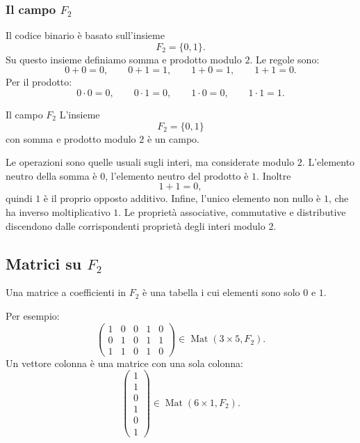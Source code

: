 \documentclass[a4paper]{article}
\begin{document}
\subsubsection{Il campo \(F_2\)}

Il codice binario è basato sull'insieme
\[
    F_2=\{0,1\}.
\]
Su questo insieme definiamo somma e prodotto modulo \(2\). Le regole sono:
\[
    0+0=0,
    \qquad
    0+1=1,
    \qquad
    1+0=1,
    \qquad
    1+1=0.
\]
Per il prodotto:
\[
    0\cdot 0=0,
    \qquad
    0\cdot 1=0,
    \qquad
    1\cdot 0=0,
    \qquad
    1\cdot 1=1.
\]

\begin{snippetproposition}{Il campo \(F_2\)}
    L'insieme
    \[
        F_2=\{0,1\}
    \]
    con somma e prodotto modulo \(2\) è un campo.
\end{snippetproposition}

\begin{snippetproof}{}
    Le operazioni sono quelle usuali sugli interi, ma considerate modulo \(2\). L'elemento neutro della somma è \(0\), l'elemento neutro del prodotto è \(1\). Inoltre
    \[
        1+1=0,
    \]
    quindi \(1\) è il proprio opposto additivo. Infine, l'unico elemento non nullo è \(1\), che ha inverso moltiplicativo \(1\). Le proprietà associative, commutative e distributive discendono dalle corrispondenti proprietà degli interi modulo \(2\).
\end{snippetproof}

\subsection{Matrici su \(F_2\)}

Una matrice a coefficienti in \(F_2\) è una tabella i cui elementi sono solo \(0\) e \(1\).

Per esempio:
\[
    \begin{pmatrix}
        1 & 0 & 0 & 1 & 0\\
        0 & 1 & 0 & 1 & 1\\
        1 & 1 & 0 & 1 & 0
    \end{pmatrix}
    \in
    \operatorname{Mat}(3\times 5,F_2).
\]
Un vettore colonna è una matrice con una sola colonna:
\[
    \begin{pmatrix}
        1\\
        1\\
        0\\
        1\\
        0\\
        1
    \end{pmatrix}
    \in
    \operatorname{Mat}(6\times 1,F_2).
\]
\end{document}
